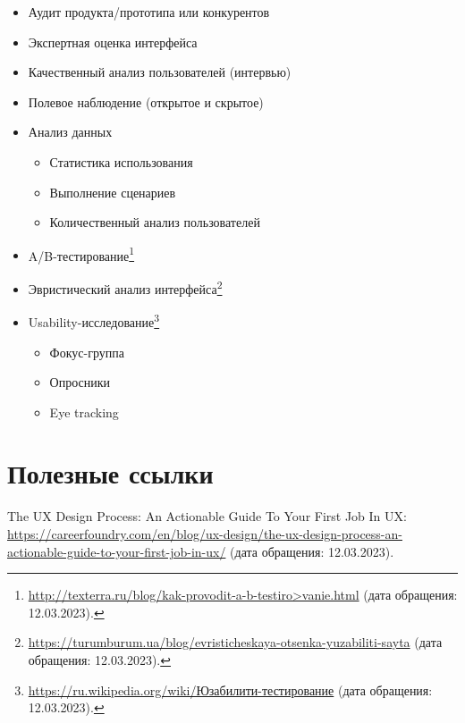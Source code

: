 \documentclass{../../text-style}
\begin{document}
\begin{itemize}
    \item Аудит продукта/прототипа или конкурентов
    \item Экспертная оценка интерфейса
    \item Качественный анализ пользователей (интервью)
    \item Полевое наблюдение (открытое и скрытое)
    \item Анализ данных
    \begin{itemize}
        \item Статистика использования
        \item Выполнение сценариев
        \item Количественный анализ пользователей
    \end{itemize}
    \item A/B-тестирование\footnote{\url{http://texterra.ru/blog/kak-provodit-a-b-testiro>vanie.html} (дата обращения: 12.03.2023).}
    \item Эвристический анализ интерфейса\footnote{\url{https://turumburum.ua/blog/evristicheskaya-otsenka-yuzabiliti-sayta} (дата обращения: 12.03.2023).}
    \item Usability-исследование\footnote{\url{https://ru.wikipedia.org/wiki/Юзабилити-тестирование} (дата обращения: 12.03.2023).}
    \begin{itemize}
        \item Фокус-группа
        \item Опросники
        \item Eye tracking
    \end{itemize}
\end{itemize}

\section{Полезные ссылки}

The UX Design Process: An Actionable Guide To Your First Job In UX: \url{https://careerfoundry.com/en/blog/ux-design/the-ux-design-process-an-actionable-guide-to-your-first-job-in-ux/} (дата обращения: 12.03.2023).
\end{document}
